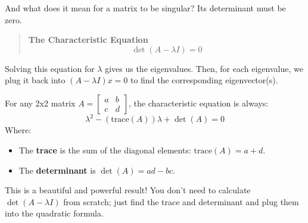 \documentclass[
  letterpaper,
  DIV=11,
  numbers=noendperiod]{scrreprt}
\begin{document}
And what does it mean for a matrix to be singular? Its determinant must
be zero.

\begin{quote}
\textbf{The Characteristic Equation} \[ \det(A - \lambda I) = 0 \]
\end{quote}

Solving this equation for \(\lambda\) gives us the eigenvalues. Then,
for each eigenvalue, we plug it back into \((A - \lambda I)x = 0\) to
find the corresponding eigenvector(s).

\begin{tcolorbox}[enhanced jigsaw, left=2mm, colback=white, coltitle=black, colbacktitle=quarto-callout-note-color!10!white, toprule=.15mm, opacitybacktitle=0.6, breakable, bottomrule=.15mm, colframe=quarto-callout-note-color-frame, arc=.35mm, toptitle=1mm, rightrule=.15mm, title=\textcolor{quarto-callout-note-color}{\faInfo}\hspace{0.5em}{Shortcut for finding eigen values of 2x2 Matrices}, opacityback=0, titlerule=0mm, bottomtitle=1mm, leftrule=.75mm]

For any 2x2 matrix \(A = \begin{bmatrix} a & b \\ c & d \end{bmatrix}\),
the characteristic equation is always:
\[ \lambda^2 - (\text{trace}(A))\lambda + \det(A) = 0 \] Where:

\begin{itemize}
\item
  The \textbf{trace} is the sum of the diagonal elements:
  \(\text{trace}(A) = a+d\).
\item
  The \textbf{determinant} is \(\det(A) = ad-bc\).
\end{itemize}

This is a beautiful and powerful result! You don't need to calculate
\(\det(A - \lambda I)\) from scratch; just find the trace and
determinant and plug them into the quadratic formula.

\end{tcolorbox}
\end{document}
